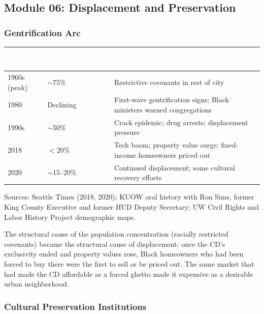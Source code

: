 \documentclass[11pt,letterpaper]{article}
\newcommand{\tableheader}[1]{\textbf{\sffamily\textcolor{white}{#1}}}
\begin{document}
\subsection{Module 06: Displacement and Preservation}

\subsubsection{Gentrification Arc}

\begin{center}
\begin{tabularx}{\textwidth}{L{2cm}C{3cm}X}
\toprule
{}
\tableheader{Period} & \tableheader{CD Black Population} & \tableheader{Primary Driver} \\
\midrule
1960s (peak) & $\sim$75\% & Restrictive covenants in rest of city \\
1980 & Declining & First-wave gentrification signs; Black ministers warned congregations \\
1990s & $\sim$50\% & Crack epidemic; drug arrests; displacement pressure \\
2018 & $<$20\% & Tech boom; property value surge; fixed-income homeowners priced out \\
2020 & $\sim$15--20\% & Continued displacement; some cultural recovery efforts \\
\bottomrule
\end{tabularx}
\end{center}

Sources: Seattle Times (2018, 2020); KUOW oral history with Ron Sims, former King County Executive and former HUD Deputy Secretary; UW Civil Rights and Labor History Project demographic maps.

The structural cause of the population concentration (racially restricted covenants) became the structural cause of displacement: once the CD's exclusivity ended and property values rose, Black homeowners who had been forced to buy there were the first to sell or be priced out. The same market that had made the CD affordable as a forced ghetto made it expensive as a desirable urban neighborhood.

\subsubsection{Cultural Preservation Institutions}
\end{document}
